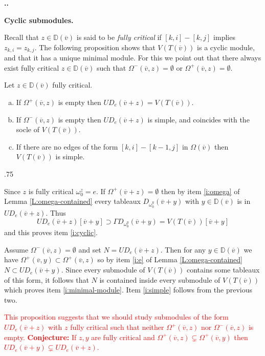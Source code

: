 \documentclass[11pt,fleqn]{amsart}
\makeatletter
\renewcommand\thesection{\arabic{section}}
\renewcommand\proofname{Proof}
\renewenvironment{proof}[1][\textit{\proofname}]{\par
 \pushQED{\qed}%
 \normalfont \topsep.75\paraskip\relax
 \trivlist
 \item[\hskip\labelsep
 \itshape
 #1\@addpunct{.}]\ignorespaces
}{%
 \popQED\endtrivlist\@endpefalse
}
\newcounter{para}[section]
\renewcommand\thepara{\thesection.\arabic{para}}
\def\paragraph{%
 \noindent
 \refstepcounter{para}%
 \textbf{\thepara.}\hspace{1ex}%
}
\newcommand\about[1]{%
 {\bfseries#1.}%
}
\newcommand\vv{\overline{v}}
\newcommand\DD{\mathbb D}
\makeatother
\begin{document}
\paragraph
\about{Cyclic submodules}
Recall that $z \in \DD(\vv)$ is said to be \emph{fully critical} if $[k,i] - 
[k,j]$ implies $z_{k,i} = z_{k,j}$. The following proposition shows that 
$V(T(\vv))$ is a cyclic module, and that it has a unique minimal module. For 
this we point out that there always exist fully critical $z \in \DD(\vv)$ 
such that $\Omega^-(\vv,z) = \emptyset$ or $\Omega^+(\vv,z) = \emptyset$.
\begin{Proposition}
Let $z \in \DD(\vv)$ fully critical.
\begin{enumerate}[(a)]
\item 
\label{i:cyclic}
If $\Omega^+(\vv, z)$ is empty then $U D_e(\vv + z) = V(T(\vv))$.

\item
\label{i:minimal-module}
If $\Omega^-(\vv,z)$ is empty then $U D_e(\vv + z)$ is simple, and coincides 
with the socle of $V(T(\vv))$.

\item
\label{i:simple}
If there are no edges of the form $[k,i] - [k-1,j]$ in $\Omega(\vv)$ then
$V(T(\vv))$ is simple.
\end{enumerate}
\end{Proposition}
\begin{proof}
Since $z$ is fully critical $\omega_0^z = e$. If $\Omega^+(\vv + z) = 
\emptyset$ then by item \ref{i:omega} of Lemma \ref{L:omega-contained} every
tableaux $D_{\omega_0^y}(\vv + y)$ with $y \in \DD(\vv)$ is in $U D_e(\vv+z)$.
Thus 
\[
U D_e(\vv+z)[\vv + y] 
	\supset \Gamma D_{\omega_0^y}(\vv+y) 
	= V(T(\vv))[\vv+y]
\]
and this proves item \ref{i:cyclic}.

Assume $\Omega^-(\vv,z) = \emptyset$ and set $N = U D_e(\vv + z)$. Then 
for any $y \in \DD(\vv)$ we have $\Omega^+(\vv,y) \subset \Omega^+(\vv,z)$ so
by item \ref{i:e} of Lemma \ref{L:omega-contained} $N \subset U D_e(\vv + y)$.
Since every submodule of $V(T(\vv))$ contains some tableaux of this form, it
follows that $N$ is contained inside every submodule of $V(T(\vv))$ which 
proves item \ref{i:minimal-module}. Item \ref{i:simple} follows from the 
previous two.
\end{proof}

\textcolor{red}{This proposition suggests that we should study submodules of 
the form $U D_e(\vv+z)$ with $z$ fully critical such that neither 
$\Omega^+(\vv,z)$ nor $\Omega^-(\vv,z)$ is empty. \textbf{Conjecture:} If $z,y$
are fully critical and $\Omega^+(\vv,z) \subsetneq \Omega^+(\vv,y)$ then 
$UD_e(\vv + y) \subsetneq UD_e(\vv + z)$.}
\end{document}
